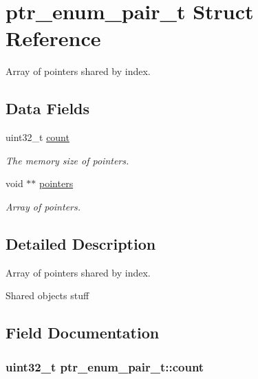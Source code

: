 \hypertarget{structptr__enum__pair__t}{}\section{ptr\+\_\+enum\+\_\+pair\+\_\+t Struct Reference}
\label{structptr__enum__pair__t}


Array of pointers shared by index.  


\subsection*{Data Fields}
\begin{DoxyCompactItemize}
\item 
uint32\+\_\+t \hyperlink{structptr__enum__pair__t_a23e0f7745fdd3d2a1a474c85526bff88}{count}
\begin{DoxyCompactList}\small\item\em The memory size of pointers. \end{DoxyCompactList}\item 
void $\ast$$\ast$ \hyperlink{structptr__enum__pair__t_ae18583c8ba1ddc5f25d45cc0a8022c97}{pointers}
\begin{DoxyCompactList}\small\item\em Array of pointers. \end{DoxyCompactList}\end{DoxyCompactItemize}


\subsection{Detailed Description}
Array of pointers shared by index. 

Shared objects\textquotesingle{} stuff 

\subsection{Field Documentation}
\subsubsection[{\texorpdfstring{count}{count}}]{\setlength{\rightskip}{0pt plus 5cm}uint32\+\_\+t ptr\+\_\+enum\+\_\+pair\+\_\+t\+::count}\hypertarget{structptr__enum__pair__t_a23e0f7745fdd3d2a1a474c85526bff88}{}\label{structptr__enum__pair__t_a23e0f7745fdd3d2a1a474c85526bff88}


